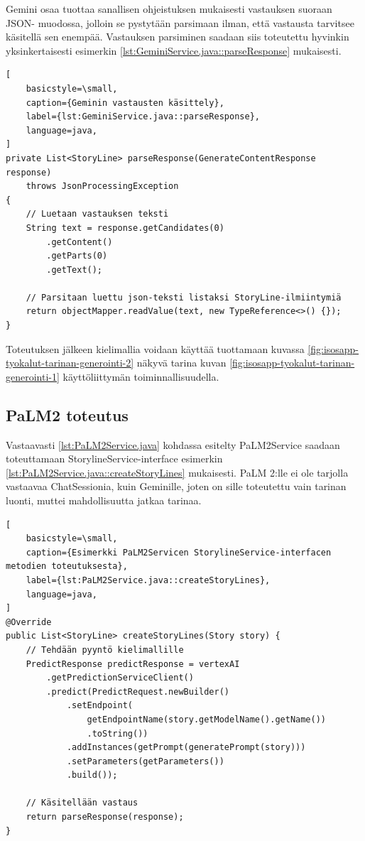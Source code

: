 Gemini osaa tuottaa sanallisen ohjeistuksen mukaisesti vastauksen suoraan JSON-
muodossa, jolloin se pystytään parsimaan ilman, että vastausta tarvitsee
käsitellä sen enempää. Vastauksen parsiminen saadaan siis toteutettu hyvinkin
yksinkertaisesti esimerkin \ref{lst:GeminiService.java::parseResponse}
mukaisesti.

\begin{lstlisting}[
    basicstyle=\small,
    caption={Geminin vastausten käsittely},
    label={lst:GeminiService.java::parseResponse},
    language=java,
]
private List<StoryLine> parseResponse(GenerateContentResponse response)
    throws JsonProcessingException
{
    // Luetaan vastauksen teksti
    String text = response.getCandidates(0)
        .getContent()
        .getParts(0)
        .getText();

    // Parsitaan luettu json-teksti listaksi StoryLine-ilmiintymiä
    return objectMapper.readValue(text, new TypeReference<>() {});
}
\end{lstlisting}

Toteutuksen jälkeen kielimallia voidaan käyttää tuottamaan kuvassa
\ref{fig:isosapp-tyokalut-tarinan-generointi-2} näkyvä tarina kuvan
\ref{fig:isosapp-tyokalut-tarinan-generointi-1} käyttöliittymän
toiminnallisuudella.

\subsection{PaLM2 toteutus}

Vastaavasti \ref{lst:PaLM2Service.java} kohdassa esitelty PaLM2Service saadaan
toteuttamaan StorylineService-interface esimerkin
\ref{lst:PaLM2Service.java::createStoryLines} mukaisesti. PaLM 2:lle ei ole
tarjolla vastaavaa ChatSessionia, kuin Geminille, joten on sille toteutettu
vain tarinan luonti, muttei mahdollisuutta jatkaa tarinaa.

\begin{lstlisting}[
    basicstyle=\small,
    caption={Esimerkki PaLM2Servicen StorylineService-interfacen metodien toteutuksesta},
    label={lst:PaLM2Service.java::createStoryLines},
    language=java,
]
@Override
public List<StoryLine> createStoryLines(Story story) {
    // Tehdään pyyntö kielimallille
    PredictResponse predictResponse = vertexAI
        .getPredictionServiceClient()
        .predict(PredictRequest.newBuilder()
            .setEndpoint(
                getEndpointName(story.getModelName().getName())
                .toString())
            .addInstances(getPrompt(generatePrompt(story)))
            .setParameters(getParameters())
            .build());

    // Käsitellään vastaus
    return parseResponse(response);
}
\end{lstlisting}

